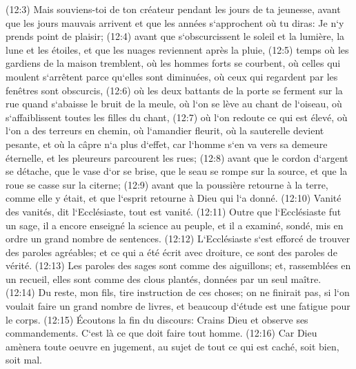 \verse (12:3) Mais souviens-toi de ton créateur pendant les jours de ta jeunesse, avant que les jours mauvais arrivent et que les années s`approchent où tu diras: Je n`y prends point de plaisir; 
\verse (12:4) avant que s`obscurcissent le soleil et la lumière, la lune et les étoiles, et que les nuages reviennent après la pluie, 
\verse (12:5) temps où les gardiens de la maison tremblent, où les hommes forts se courbent, où celles qui moulent s`arrêtent parce qu`elles sont diminuées, où ceux qui regardent par les fenêtres sont obscurcis, 
\verse (12:6) où les deux battants de la porte se ferment sur la rue quand s`abaisse le bruit de la meule, où l`on se lève au chant de l`oiseau, où s`affaiblissent toutes les filles du chant, 
\verse (12:7) où l`on redoute ce qui est élevé, où l`on a des terreurs en chemin, où l`amandier fleurit, où la sauterelle devient pesante, et où la câpre n`a plus d`effet, car l`homme s`en va vers sa demeure éternelle, et les pleureurs parcourent les rues; 
\verse (12:8) avant que le cordon d`argent se détache, que le vase d`or se brise, que le seau se rompe sur la source, et que la roue se casse sur la citerne; 
\verse (12:9) avant que la poussière retourne à la terre, comme elle y était, et que l`esprit retourne à Dieu qui l`a donné. 
\verse (12:10) Vanité des vanités, dit l`Ecclésiaste, tout est vanité. 
\verse (12:11) Outre que l`Ecclésiaste fut un sage, il a encore enseigné la science au peuple, et il a examiné, sondé, mis en ordre un grand nombre de sentences. 
\verse (12:12) L`Ecclésiaste s`est efforcé de trouver des paroles agréables; et ce qui a été écrit avec droiture, ce sont des paroles de vérité. 
\verse (12:13) Les paroles des sages sont comme des aiguillons; et, rassemblées en un recueil, elles sont comme des clous plantés, données par un seul maître. 
\verse (12:14) Du reste, mon fils, tire instruction de ces choses; on ne finirait pas, si l`on voulait faire un grand nombre de livres, et beaucoup d`étude est une fatigue pour le corps. 
\verse (12:15) Écoutons la fin du discours: Crains Dieu et observe ses commandements. C`est là ce que doit faire tout homme. 
\verse (12:16) Car Dieu amènera toute oeuvre en jugement, au sujet de tout ce qui est caché, soit bien, soit mal. 
